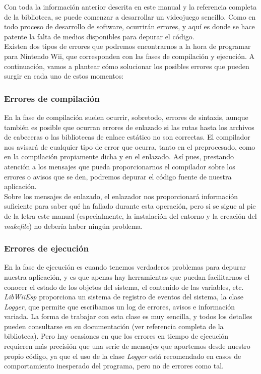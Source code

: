 Con toda la información anterior descrita en este manual y la referencia completa de la biblioteca, se puede comenzar a desarrollar un videojuego sencillo. Como en todo proceso de desarrollo de software, ocurrirán errores, y aquí es donde se hace patente la falta de medios disponibles para depurar el código.\\

Existen dos tipos de errores que podremos encontrarnos a la hora de programar para Nintendo Wii, que corresponden con las fases de compilación y ejecución. A continuación, vamos a plantear cómo solucionar los posibles errores que pueden surgir en cada uno de estos momentos:

\subsubsection{Errores de compilación}

En la fase de compilación suelen ocurrir, sobretodo, errores de sintaxis, aunque también es posible que ocurran errores de enlazado si las rutas hasta los archivos de cabeceras o las bibliotecas de enlace estático no son correctas. El compilador nos avisará de cualquier tipo de error que ocurra, tanto en el preprocesado, como en la compilación propiamente dicha y en el enlazado. Así pues, prestando atención a los mensajes que pueda proporcionarnos el compilador sobre los errores o avisos que se den, podremos depurar el código fuente de nuestra aplicación.\\

Sobre los mensajes de enlazado, el enlazador nos proporcionará información suficiente para saber qué ha fallado durante esta operación, pero si se sigue al pie de la letra este manual (especialmente, la instalación del entorno y la creación del \emph{makefile}) no debería haber ningún problema.

\subsubsection{Errores de ejecución}

En la fase de ejecución es cuando tenemos verdaderos problemas para depurar nuestra aplicación, y es que apenas hay herramientas que puedan facilitarnos el conocer el estado de los objetos del sistema, el contenido de las variables, etc.\\

\emph{LibWiiEsp} proporciona un sistema de registro de eventos del sistema, la clase \emph{Logger}, que permite que escribamos un log de errores, avisos e información variada. La forma de trabajar con esta clase es muy sencilla, y todos los detalles pueden consultarse en su documentación (ver referencia completa de la biblioteca). Pero hay ocasiones en que los errores en tiempo de ejecución requieren más precisión que una serie de mensajes que aportemos desde nuestro propio código, ya que el uso de la clase \emph{Logger} está recomendado en casos de comportamiento inesperado del programa, pero no de errores como tal.\\

